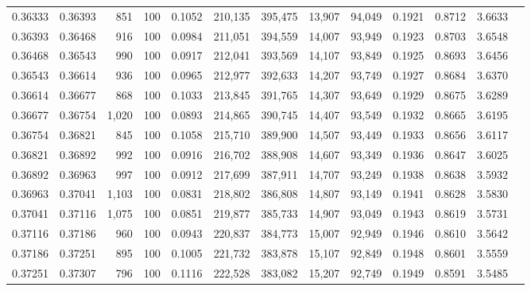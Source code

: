 \begin{tabular}{rrrrrrrrrrrrr}
0.36333 & 0.36393 &   851 & 100 &                                     0.1052 & 210,135 & 395,475 &  13,907 &  94,049 & 0.1921 & 0.8712 & 3.6633 \\
0.36393 & 0.36468 &   916 & 100 &                                     0.0984 & 211,051 & 394,559 &  14,007 &  93,949 & 0.1923 & 0.8703 & 3.6548 \\
0.36468 & 0.36543 &   990 & 100 &                                     0.0917 & 212,041 & 393,569 &  14,107 &  93,849 & 0.1925 & 0.8693 & 3.6456 \\
0.36543 & 0.36614 &   936 & 100 &                                     0.0965 & 212,977 & 392,633 &  14,207 &  93,749 & 0.1927 & 0.8684 & 3.6370 \\
0.36614 & 0.36677 &   868 & 100 &                                     0.1033 & 213,845 & 391,765 &  14,307 &  93,649 & 0.1929 & 0.8675 & 3.6289 \\
0.36677 & 0.36754 & 1,020 & 100 &                                     0.0893 & 214,865 & 390,745 &  14,407 &  93,549 & 0.1932 & 0.8665 & 3.6195 \\
0.36754 & 0.36821 &   845 & 100 &                                     0.1058 & 215,710 & 389,900 &  14,507 &  93,449 & 0.1933 & 0.8656 & 3.6117 \\
0.36821 & 0.36892 &   992 & 100 &                                     0.0916 & 216,702 & 388,908 &  14,607 &  93,349 & 0.1936 & 0.8647 & 3.6025 \\
0.36892 & 0.36963 &   997 & 100 &                                     0.0912 & 217,699 & 387,911 &  14,707 &  93,249 & 0.1938 & 0.8638 & 3.5932 \\
0.36963 & 0.37041 & 1,103 & 100 &                                     0.0831 & 218,802 & 386,808 &  14,807 &  93,149 & 0.1941 & 0.8628 & 3.5830 \\
0.37041 & 0.37116 & 1,075 & 100 &                                     0.0851 & 219,877 & 385,733 &  14,907 &  93,049 & 0.1943 & 0.8619 & 3.5731 \\
0.37116 & 0.37186 &   960 & 100 &                                     0.0943 & 220,837 & 384,773 &  15,007 &  92,949 & 0.1946 & 0.8610 & 3.5642 \\
0.37186 & 0.37251 &   895 & 100 &                                     0.1005 & 221,732 & 383,878 &  15,107 &  92,849 & 0.1948 & 0.8601 & 3.5559 \\
0.37251 & 0.37307 &   796 & 100 &                                     0.1116 & 222,528 & 383,082 &  15,207 &  92,749 & 0.1949 & 0.8591 & 3.5485 \\

\end{tabular}
